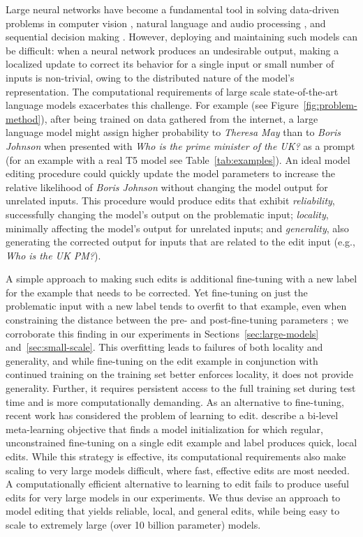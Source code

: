 \documentclass{article}
\begin{document}
Large neural networks have become a fundamental tool in solving data-driven problems in computer vision \citep{huang2017densely}, natural language and audio processing \citep{vaswani2017attention}, and sequential decision making \citep{wu2021greedy}. However, deploying and maintaining such models can be difficult: when a neural network produces an undesirable output, making a localized update to correct its behavior for a single input or small number of inputs is non-trivial, owing to the distributed nature of the model's representation. The computational requirements of large scale state-of-the-art language models exacerbates this challenge. For example (see Figure~\ref{fig:problem-method}), after being trained on data gathered from the internet, a large language model might assign higher probability to \textit{Theresa May} than to \textit{Boris Johnson} when presented with \textit{Who is the prime minister of the UK?} as a prompt (for an example with a real T5 model \citep{2020t5} see Table~\ref{tab:examples}). An ideal model editing procedure could quickly update the model parameters to increase the relative likelihood of \textit{Boris Johnson} without changing the model output for unrelated inputs. This procedure would produce edits that exhibit \textit{reliability}, successfully changing the model's output on the problematic input; \textit{locality}, minimally affecting the model's output for unrelated inputs; and \textit{generality}, also generating the corrected output for inputs that are related to the edit input (e.g., \textit{Who is the UK PM?}).

A simple approach to making such edits is additional fine-tuning with a new label for the example that needs to be corrected. Yet fine-tuning on just the problematic input with a new label tends to overfit to that example, even when constraining the distance between the pre- and post-fine-tuning parameters \citep{zhu2020modifying,Cao2021EditingFK}; we corroborate this finding in our experiments in Sections~\ref{sec:large-models} and~\ref{sec:small-scale}. This overfitting leads to failures of both locality and generality, and while fine-tuning on the edit example in conjunction with continued training on the training set better enforces locality, it does not provide generality. Further, it requires persistent access to the full training set during test time and is more computationally demanding. As an alternative to fine-tuning, recent work has considered the problem of learning to edit. \cite{Sinitsin2020Editable} describe a bi-level meta-learning objective that finds a model initialization for which regular, unconstrained fine-tuning on a single edit example and label produces quick, local edits. While this strategy is effective, its computational requirements also make scaling to very large models difficult, where fast, effective edits are most needed. A computationally efficient alternative to learning to edit \citep{Cao2021EditingFK} fails to produce useful edits for very large models in our experiments. We thus devise an approach to model editing that yields reliable, local, and general edits, while being easy to scale to extremely large (over 10 billion parameter) models.
\end{document}
